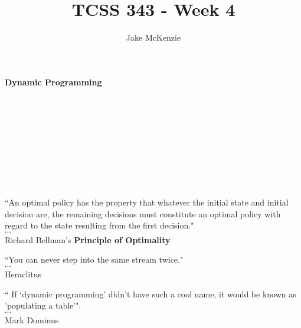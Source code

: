 \documentclass[12pt]{article}
\begin{document}
\title{TCSS 343 - Week 4}
\author{Jake McKenzie}
\maketitle
\noindent\centerline{\textbf{Dynamic Programming}}\\\\\\\\\\\\\\\\
\begin{center}
    ``An optimal policy has the property that whatever the initial state and initial decision are, the remaining decisions must constitute an optimal policy with regard to the state resulting from the first decision." \\$\cdots$\\  Richard Bellman's \textbf{Principle of Optimality}
\end{center}
\begin{center}
    ``You can never step into the same stream twice." \\$\cdots$\\  Heraclitus
\end{center}
\begin{center}
    `` If `dynamic programming' didn't have such a cool name, it would be known as 'populating a table'". \\$\cdots$\\ Mark Dominus 
\end{center}
\newpage
\end{document}
